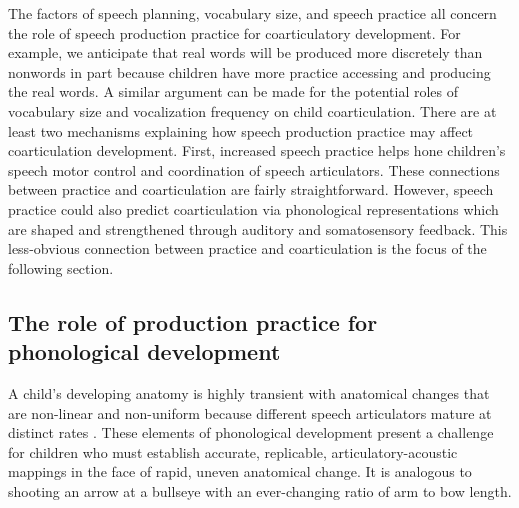 \documentclass[a4paper,man,natbib,donotrepeattitle, apacite]{apa6}
\begin{document}
The factors of speech planning, vocabulary size, and speech practice all concern the role of speech production practice for coarticulatory development. For example, we anticipate that real words will be produced more discretely than nonwords in part because children have more practice accessing and producing the real words. A similar argument can be made for the potential roles of vocabulary size and vocalization frequency on child coarticulation. There are at least two mechanisms explaining how speech production practice may affect coarticulation development. First, increased speech practice helps hone children's speech motor control and coordination of speech articulators. These connections between practice and coarticulation are fairly straightforward. However, speech practice could also predict coarticulation via phonological representations which are shaped and strengthened through auditory and somatosensory feedback. This less-obvious connection between practice and coarticulation is the focus of the following section.

\subsection{The role of production practice for phonological development}

A child’s developing anatomy is highly transient with anatomical changes that are non-linear \cite{vorperianDevelopmentVocalTract2005} and non-uniform because different speech articulators mature at distinct rates \cite{nittrouerEmergenceMatureGestural1993}. These elements of phonological development present a challenge for children who must establish accurate, replicable, articulatory-acoustic mappings in the face of rapid, uneven anatomical change. It is analogous to shooting an arrow at a bullseye with an ever-changing ratio of arm to bow length. 
\end{document}
